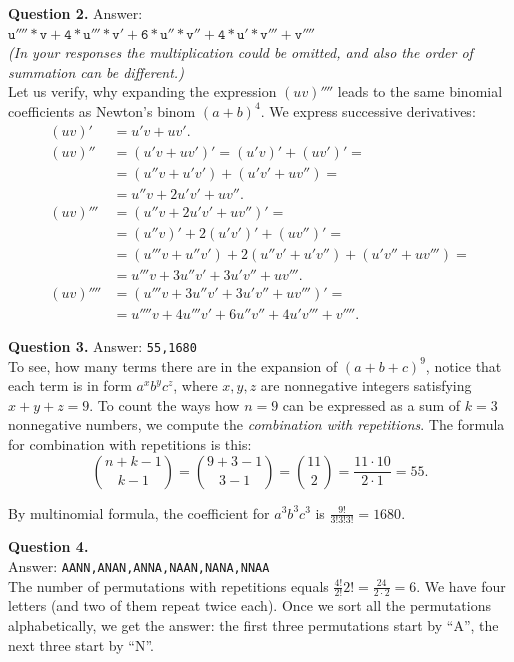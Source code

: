 \documentclass[jou]{apa6}
\begin{document}
\vspace{10pt}
{\bf Question 2.} Answer:\\
$\mathtt{u''''*v+4*u'''*v'+6*u''*v''+4*u'*v'''+v''''}$\\
{\em (In your responses the multiplication could be omitted, and also the 
order of summation can be different.)}\\
Let us verify, why expanding the expression $(uv)''''$ leads to the same binomial coefficients
as Newton's binom $(a+b)^4$. We express successive derivatives:
\begin{align}
(uv)' & = u'v + uv'. \\
(uv)'' & = (u'v + uv')' = (u'v)' + (uv')' = \nonumber \\
 & = (u''v + u'v') + (u'v' + uv'') = \nonumber \\
 & = u''v + 2u'v' + uv''.\\
(uv)''' & = (u''v + 2u'v' + uv'')' = \nonumber \\
 & = (u''v)' + 2(u'v')' + (uv'')' = \nonumber \\
 & = (u'''v + u''v') + 2(u''v' + u'v'') + (u'v'' + uv''') = \nonumber \\
 & = u'''v + 3u''v' + 3u'v'' + uv'''.\\
(uv)'''' & = (u'''v + 3u''v' + 3u'v'' + uv''')' = \nonumber \\
 & = u''''v+4u'''v'+6u''v''+4u'v'''+v''''.
\end{align}


\vspace{10pt}
{\bf Question 3.} Answer: {\tt 55,1680}\\
To see, how many terms there are in the expansion of $(a+b+c)^9$, 
notice that each term is in form $a^xb^yc^z$, where $x,y,z$ are nonnegative
integers satisfying $x+y+z=9$. To count the ways how $n=9$ can be expressed
as a sum of $k=3$ nonnegative numbers, we compute the {\em combination with 
repetitions}. The formula for combination with repetitions is this:
$${n+k-1 \choose k-1} = {9+3-1 \choose 3-1} = {11 \choose 2} = \frac{11 \cdot 10}{2 \cdot 1} = 55.$$

By multinomial formula, the coefficient for $a^3b^3c^3$ is $\frac{9!}{3!3!3!} = 1680$.



\vspace{10pt}
{\bf Question 4.}\\ Answer: {\tt AANN,ANAN,ANNA,NAAN,NANA,NNAA}\\
The number of permutations with repetitions equals $\frac{4!}{2!}{2!} = \frac{24}{2 \cdot 2} = 6$.
We have four letters (and two of them repeat twice each).
Once we sort all the permutations alphabetically, we get the answer: 
the first three permutations start by ``A'', the next three start by ``N''.
\end{document}
